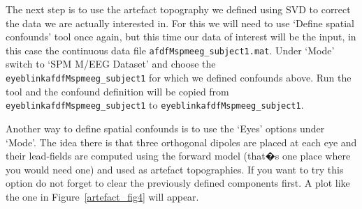 The next step is to use the artefact topography we defined using SVD to correct the data we are actually interested in. For this we will need to use `Define spatial confounds' tool once again, but this time our data of interest will be the input, in this case the continuous data file \texttt{afdfMspmeeg\_subject1.mat}. Under `Mode' switch to `SPM M/EEG Dataset' and choose the \texttt{eyeblinkafdfMspmeeg\_subject1} for which we defined confounds above. Run the tool and the confound definition will be copied from \texttt{eyeblinkafdfMspmeeg\_subject1} to \texttt{eyeblinkafdfMspmeeg\_subject1}.

Another way to define spatial confounds is to use the `Eyes' options under `Mode'. The idea there is that three orthogonal dipoles are placed at each eye and their lead-fields are computed using the forward model (that�s one place where you would need one) and used as artefact topographies. If you want to try this option do not forget to clear the previously defined components first. A plot like the one in Figure~\ref{artefact_fig4} will appear.

